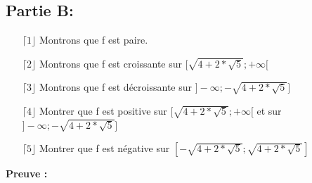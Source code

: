 \documentclass[a4paper, 12pt]{article}
\begin{document}
\newpage

\subsection{Partie B:}

\begin{itemize}
	\item[\(\lceil 1 \rfloor\)] Montrons que f est paire.
	\item[\(\lceil 2 \rfloor\)] Montrons que f est croissante sur \( [ \sqrt{4 + 2 * \sqrt{5}} ; +\infty [ \)
	\item[\(\lceil 3 \rfloor\)] Montrons que f est décroissante sur \( ] -\infty ; -\sqrt{4 + 2 * \sqrt{5}} ] \)
	\item[\(\lceil 4 \rfloor\)] Montrer que f est positive sur \( [ \sqrt{4 + 2 * \sqrt{5}} ; +\infty [ \) et sur \( ] -\infty ; -\sqrt{4 + 2 * \sqrt{5}} ] \)
	\item[\(\lceil 5 \rfloor\)] Montrer que f est négative sur \( [ -\sqrt{4 + 2 * \sqrt{5}} ; \sqrt{4 + 2 * \sqrt{5}} ] \)
\end{itemize}

\textbf{Preuve :}
\end{document}
